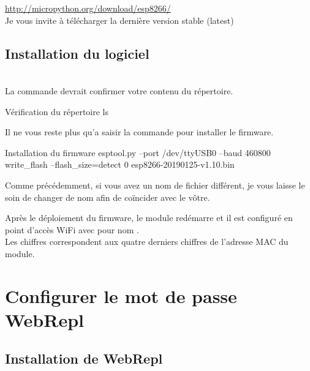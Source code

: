 \url{http://micropython.org/download/esp8266/}\\

Je vous invite à télécharger la dernière version stable (latest)


\subsection{Installation du logiciel}

 \\

La commande  devrait confirmer votre contenu du répertoire.

\begin{Bash}{Vérification du répertoire}
ls
\end{Bash}


Il ne vous reste plus qu'a saisir la commande pour installer le firmware. \\
\begin{Bash}{Installation du firmware}
esptool.py --port /dev/ttyUSB0 --baud 460800 write_flash --flash_size=detect 0 esp8266-20190125-v1.10.bin
\end{Bash}

Comme précédemment, si vous avez un nom de fichier différent, je vous laisse le soin de changer de nom afin de coïncider avec le vôtre.


Après le déploiement du firmware, le module redémarre et il est configuré en point d’accès WiFi avec pour nom . \\ Les chiffres correspondent aux quatre derniers chiffres de l'adresse MAC du module. 


\section{Configurer le mot de passe WebRepl}

\subsection{Installation de WebRepl}

